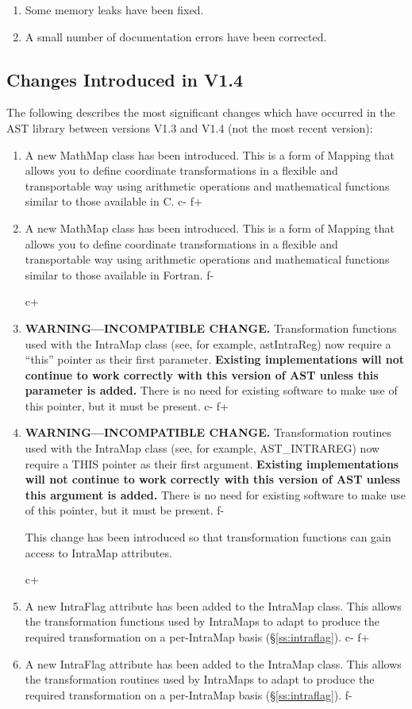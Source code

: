 \documentclass[twoside,11pt]{starlink}
\providecommand{\secref}[1]{\S\ref{#1}}
\begin{document}
\begin{enumerate}
\item Some memory leaks have been fixed.

\item A small number of documentation errors have been corrected.
\end{enumerate}

\subsection{Changes Introduced in V1.4}

The following describes the most significant changes which have occurred
in the AST library between versions V1.3 and V1.4 (not the most recent
version):

\begin{enumerate}
c+
\item A new MathMap class has been introduced. This is a form of
Mapping that allows you to define coordinate transformations in a
flexible and transportable way using arithmetic operations and
mathematical functions similar to those available in C.
c-
f+
\item A new MathMap class has been introduced. This is a form of
Mapping that allows you to define coordinate transformations in a
flexible and transportable way using arithmetic operations and
mathematical functions similar to those available in Fortran.
f-

c+
\item {\bf{WARNING---INCOMPATIBLE CHANGE.}} Transformation functions
used with the IntraMap class (see, for example, astIntraReg) now
require a ``this'' pointer as their first parameter. \textbf{Existing
implementations will not continue to work correctly with this version
of AST unless this parameter is added.} There is no need for existing
software to make use of this pointer, but it must be present.
c-
f+
\item {\bf{WARNING---INCOMPATIBLE CHANGE.}} Transformation routines
used with the IntraMap class (see, for example, AST\_INTRAREG) now
require a THIS pointer as their first argument. \textbf{Existing
implementations will not continue to work correctly with this version
of AST unless this argument is added.} There is no need for existing
software to make use of this pointer, but it must be present.
f-

This change has been introduced so that transformation functions can gain
access to IntraMap attributes.

c+
\item A new IntraFlag attribute has been added to the IntraMap
class. This allows the transformation functions used by IntraMaps to
adapt to produce the required transformation on a per-IntraMap basis
(\secref{ss:intraflag}).
c-
f+
\item A new IntraFlag attribute has been added to the IntraMap
class. This allows the transformation routines used by IntraMaps to
adapt to produce the required transformation on a per-IntraMap basis
(\secref{ss:intraflag}).
f-


\end{enumerate}
\end{document}
